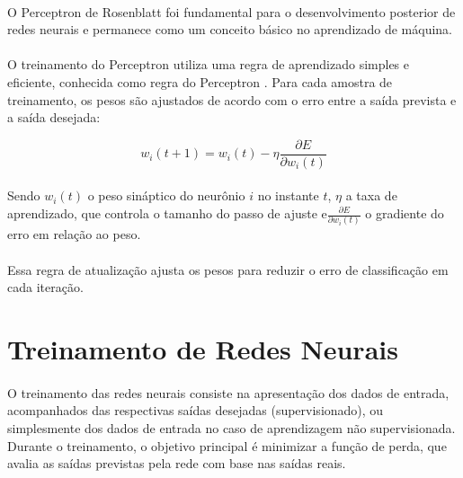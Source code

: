 \paragraph{} O Perceptron de Rosenblatt foi fundamental para o desenvolvimento posterior de redes neurais e permanece como um conceito básico no aprendizado de máquina.

\paragraph{} O treinamento do Perceptron utiliza uma regra de aprendizado simples e eficiente, conhecida como regra do Perceptron \cite{rosenblatt1958perceptron}. Para cada amostra de treinamento, os pesos são ajustados de acordo com o erro entre a saída prevista e a saída desejada:

\begin{equation}
	w_{i}(t+1) = w_{i}(t) - \eta \frac{\partial E}{\partial w_{i}(t)}
\end{equation}
\paragraph{} Sendo \(w_{i}(t)\) o peso sináptico do neurônio \(i\) no instante \(t\), \(\eta\) a taxa de aprendizado, que controla o tamanho do passo de ajuste e\(\frac{\partial E}{\partial w_{i}(t)}\) o gradiente do erro em relação ao peso.

\paragraph{} Essa regra de atualização ajusta os pesos para reduzir o erro de classificação em cada iteração.

\section{Treinamento de Redes Neurais}

\paragraph{} O treinamento das redes neurais consiste na apresentação dos dados de entrada, acompanhados das respectivas saídas desejadas (supervisionado), ou simplesmente dos dados de entrada no caso de aprendizagem não supervisionada. Durante o treinamento, o objetivo principal é minimizar a função de perda, que avalia  as saídas previstas pela rede com base nas saídas reais.

